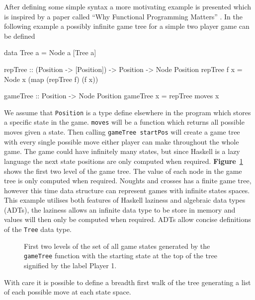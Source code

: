 \documentclass[float=false, crop=false]{standalone}
\newcommand{\namefig}{\textbf{Figure}~}
\begin{document}
After defining some simple syntax a more motivating example is presented
which is inspired by a paper called ``Why Functional Programming Matters''
\cite[]{whyfpm}. 
In the following example a possibly infinite game tree for a simple
two player game can be defined 
\begin{HaskellLst}
data Tree a = Node a [Tree a]

repTree :: (Position -> [Position]) -> Position -> Node Position
repTree f x = Node x (map (repTree f) (f x))

gameTree :: Position -> Node Position
gameTree x = repTree moves x
\end{HaskellLst}
We assume that \verb|Position| is a type define elsewhere in the program 
which stores a specific state in the game. 
\verb|moves| will be a function which returns all possible moves given a state.
Then calling \verb|gameTree startPos| will create
a game tree with every single possible move either player can make throughout
the whole game. The game could have infinitely many states, but since
Haskell is a lazy language the next state positions are only computed
when required. \namefig\ref{figure:tictactoeTree} shows the first two level of the game tree.
The value of each node in the game tree is only computed when required. Noughts and
crosses has a finite game tree, however this time data structure can represent games 
with infinite states spaces. This example utilises both features
of Haskell laziness and algebraic data types (ADTs), the laziness allows an 
infinite data type to be store in memory and values will then only be computed when
required. ADTs allow concise definitions of the \verb|Tree| data type.
\begin{figure}
  \centering
{}
\caption[Noughts and crosses game states]{First two levels of the set of all game states generated by the 
  \texttt{gameTree} function with the starting state at the top of 
  the tree signified by the label \textcolor{pgrey}{\textsf{Player 1}}.}
\label{figure:tictactoeTree}
\end{figure}
With care it is possible to define a breadth first walk of the tree generating 
a list of each possible move at each state space. 
\end{document}
